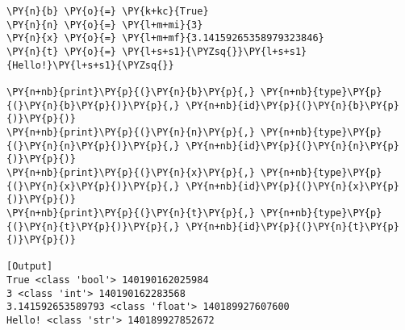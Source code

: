 \begin{Verbatim}[label=\makebox{\href{https://github.com/unipi-physics-labs/statnotes/tree/main/snippy/variables.py}{https://github.com/.../variables.py}},commandchars=\\\{\}]
\PY{n}{b} \PY{o}{=} \PY{k+kc}{True}
\PY{n}{n} \PY{o}{=} \PY{l+m+mi}{3}
\PY{n}{x} \PY{o}{=} \PY{l+m+mf}{3.14159265358979323846}
\PY{n}{t} \PY{o}{=} \PY{l+s+s1}{\PYZsq{}}\PY{l+s+s1}{Hello!}\PY{l+s+s1}{\PYZsq{}}

\PY{n+nb}{print}\PY{p}{(}\PY{n}{b}\PY{p}{,} \PY{n+nb}{type}\PY{p}{(}\PY{n}{b}\PY{p}{)}\PY{p}{,} \PY{n+nb}{id}\PY{p}{(}\PY{n}{b}\PY{p}{)}\PY{p}{)}
\PY{n+nb}{print}\PY{p}{(}\PY{n}{n}\PY{p}{,} \PY{n+nb}{type}\PY{p}{(}\PY{n}{n}\PY{p}{)}\PY{p}{,} \PY{n+nb}{id}\PY{p}{(}\PY{n}{n}\PY{p}{)}\PY{p}{)}
\PY{n+nb}{print}\PY{p}{(}\PY{n}{x}\PY{p}{,} \PY{n+nb}{type}\PY{p}{(}\PY{n}{x}\PY{p}{)}\PY{p}{,} \PY{n+nb}{id}\PY{p}{(}\PY{n}{x}\PY{p}{)}\PY{p}{)}
\PY{n+nb}{print}\PY{p}{(}\PY{n}{t}\PY{p}{,} \PY{n+nb}{type}\PY{p}{(}\PY{n}{t}\PY{p}{)}\PY{p}{,} \PY{n+nb}{id}\PY{p}{(}\PY{n}{t}\PY{p}{)}\PY{p}{)}

[Output]
True <class 'bool'> 140190162025984
3 <class 'int'> 140190162283568
3.141592653589793 <class 'float'> 140189927607600
Hello! <class 'str'> 140189927852672
\end{Verbatim}
